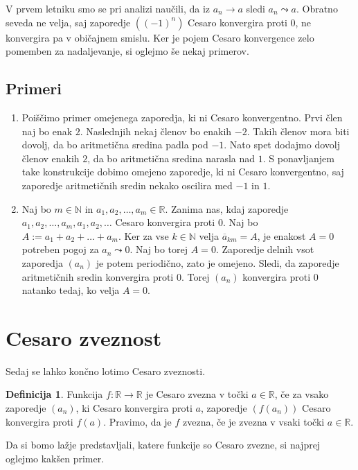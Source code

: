 \documentclass[a4paper,12pt]{article}
\theoremstyle{definition}
\newtheorem{definicija}{Definicija}
\theoremstyle{plain}
\begin{document}
V prvem letniku smo se pri analizi naučili, da iz $a_n \rightarrow a$ sledi $a_n \leadsto a$. Obratno seveda ne velja, saj zaporedje $((-1)^n)$ Cesaro konvergira proti $0$, ne konvergira pa v običajnem smislu. Ker je pojem Cesaro konvergence zelo pomemben za nadaljevanje, si oglejmo še nekaj primerov.

\subsection*{Primeri}
\begin{enumerate}
    \item Poiščimo primer omejenega zaporedja, ki ni Cesaro konvergentno. Prvi člen naj bo enak $2$. Naslednjih nekaj členov bo enakih $-2$. Takih členov mora biti dovolj, da bo aritmetična sredina padla pod $-1$. Nato spet dodajmo dovolj členov enakih $2$, da bo aritmetična sredina narasla nad $1$. S ponavljanjem take konstrukcije dobimo omejeno zaporedje, ki ni Cesaro konvergentno, saj zaporedje aritmetičnih sredin nekako oscilira med $-1$ in $1$.
    \item Naj bo $m \in \mathbb{N}$ in $a_1, a_2, \ldots, a_m \in \mathbb{R}$. Zanima nas, kdaj zaporedje $a_1, a_2, \ldots, a_m, a_1, a_2, \ldots$ Cesaro konvergira proti $0$. Naj bo $A := a_1 + a_2 + \ldots + a_m$. Ker za vse $k \in \mathbb{N}$ velja $\overline{a}_{km} = A$, je enakost $A = 0$ potreben pogoj za $a_n \leadsto 0$. Naj bo torej $A = 0$. Zaporedje delnih vsot zaporedja $(a_n)$ je potem periodično, zato je omejeno. Sledi, da zaporedje aritmetičnih sredin konvergira proti $0$. Torej $(a_n)$ konvergira proti $0$ natanko tedaj, ko velja $A = 0$.
\end{enumerate}



\section{Cesaro zveznost}
Sedaj se lahko končno lotimo Cesaro zveznosti.

\begin{definicija}
    Funkcija $f: \mathbb{R} \rightarrow \mathbb{R}$ je Cesaro zvezna v točki $a \in \mathbb{R}$, če za vsako zaporedje $(a_n)$, ki Cesaro konvergira proti $a$, zaporedje $(f(a_n))$ Cesaro konvergira proti $f(a)$. Pravimo, da je $f$ zvezna, če je zvezna v vsaki točki $a \in \mathbb{R}$.
\end{definicija}

Da si bomo lažje predstavljali, katere funkcije so Cesaro zvezne, si najprej oglejmo kakšen primer.
\end{document}
